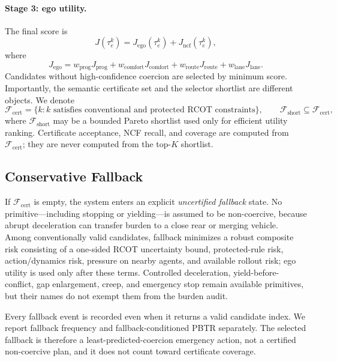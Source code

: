 \documentclass[10pt]{article}
\begin{document}
\paragraph{Stage 3: ego utility.}
The final score is
\begin{equation}
    J(\tau^k_e)
    =
    J_{\mathrm{ego}}(\tau^k_e)
    +
    J_{\mathrm{ncf}}(\tau^k_e),
\end{equation}
where
\begin{equation}
    J_{\mathrm{ego}}
    =
    w_{\mathrm{prog}}J_{\mathrm{prog}}
    +
    w_{\mathrm{comfort}}J_{\mathrm{comfort}}
    +
    w_{\mathrm{route}}J_{\mathrm{route}}
    +
    w_{\mathrm{lane}}J_{\mathrm{lane}} .
\end{equation}
Candidates without high-confidence coercion are selected by minimum score.  Importantly, the semantic certificate set and the selector shortlist are different objects.  We denote
\begin{equation}
    \mathcal F_{\mathrm{cert}}
    =\{k:\text{$k$ satisfies conventional and protected RCOT constraints}\},
    \qquad
    \mathcal F_{\mathrm{short}}\subseteq\mathcal F_{\mathrm{cert}},
\end{equation}
where $\mathcal F_{\mathrm{short}}$ may be a bounded Pareto shortlist used only for efficient utility ranking.  Certificate acceptance, NCF recall, and coverage are computed from $\mathcal F_{\mathrm{cert}}$; they are never computed from the top-$K$ shortlist.

\subsection{Conservative Fallback}
\label{app:fallback}

If $\mathcal F_{\mathrm{cert}}$ is empty, the system enters an explicit \emph{uncertified fallback} state.  No primitive---including stopping or yielding---is assumed to be non-coercive, because abrupt deceleration can transfer burden to a close rear or merging vehicle.  Among conventionally valid candidates, fallback minimizes a robust composite risk consisting of a one-sided RCOT uncertainty bound, protected-rule risk, action/dynamics risk, pressure on nearby agents, and available rollout risk; ego utility is used only after these terms.  Controlled deceleration, yield-before-conflict, gap enlargement, creep, and emergency stop remain available primitives, but their names do not exempt them from the burden audit.

Every fallback event is recorded even when it returns a valid candidate index.  We report fallback frequency and fallback-conditioned PBTR separately.  The selected fallback is therefore a least-predicted-coercion emergency action, not a certified non-coercive plan, and it does not count toward certificate coverage.
\end{document}
